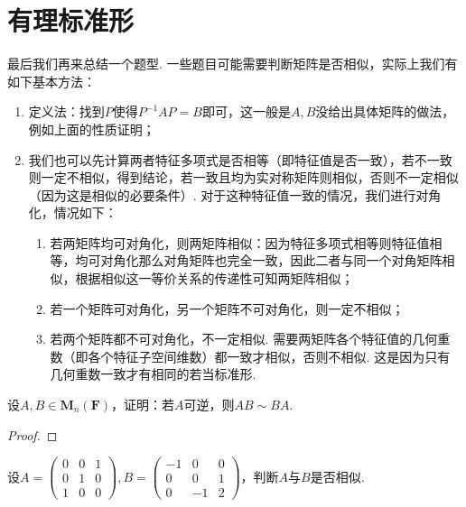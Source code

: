 \chapter{有理标准形}

最后我们再来总结一个题型. 一些题目可能需要判断矩阵是否相似，实际上我们有如下基本方法：
\begin{enumerate}
    \item 定义法：找到$P$使得$P^{-1}AP=B$即可，这一般是$A,B$没给出具体矩阵的做法，例如上面的性质证明；

    \item 我们也可以先计算两者特征多项式是否相等（即特征值是否一致），若不一致则一定不相似，得到结论，若一致且均为实对称矩阵则相似，否则不一定相似（因为这是相似的必要条件）. 对于这种特征值一致的情况，我们进行对角化，情况如下：
          \begin{enumerate}
              \item 若两矩阵均可对角化，则两矩阵相似：因为特征多项式相等则特征值相等，均可对角化那么对角矩阵也完全一致，因此二者与同一个对角矩阵相似，根据相似这一等价关系的传递性可知两矩阵相似；

              \item 若一个矩阵可对角化，另一个矩阵不可对角化，则一定不相似；

              \item 若两个矩阵都不可对角化，不一定相似. 需要两矩阵各个特征值的几何重数（即各个特征子空间维数）都一致才相似，否则不相似. 这是因为只有几何重数一致才有相同的若当标准形.
          \end{enumerate}
\end{enumerate}

\begin{example}
    设$A,B\in \mathbf{M}_n(\mathbf{F})$，证明：若$A$可逆，则$AB\sim BA$.
\end{example}

\begin{proof}

\end{proof}

\begin{example}
    设$A=\begin{pmatrix}
            0 & 0 & 1 \\ 0 & 1 & 0 \\ 1 & 0 & 0
        \end{pmatrix},B=\begin{pmatrix}
            -1 & 0 & 0 \\ 0 & 0 & 1 \\ 0 & -1 & 2
        \end{pmatrix}$，判断$A$与$B$是否相似.
\end{example}


